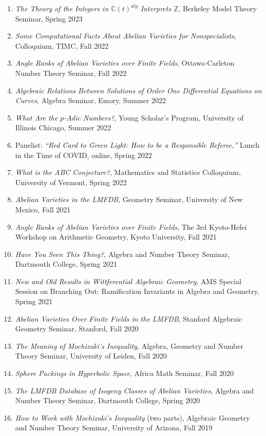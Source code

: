 \documentclass[a4paper,10pt]{article}
\begin{document}
\begin{enumerate}
	\item \emph{The Theory of the Integers in $\mathbb{C}(t)^{alg}$ Interprets $\mathbb{Z}$}, Berkeley Model Theory Seminar, Spring 2023
	\item \emph{Some Computational Facts About Abelian Varieties for Nonspecialists}, Colloquium, TIMC, Fall 2022
	\item \emph{Angle Ranks of Abelian Varieties over Finite Fields}, Ottawa-Carleton Number Theory Seminar, Fall 2022
	\item \emph{Algebraic Relations Between Solutions of Order One Differential Equations on Curves}, Algebra Seminar, Emory, Summer 2022
	\item \emph{What Are the $p$-Adic Numbers?}, Young Scholar’s Program, University of Illinois Chicago, Summer 2022
	\item Panelist: \emph{“Red Card to Green Light: How to be a Responsible Referee,”} Lunch in the Time of COVID, online, Spring 2022
	\item \emph{What is the ABC Conjecture?}, Mathematics and Statistics Colloquium, University of Vermont, Spring 2022
	\item \emph{Abelian Varieties in the LMFDB}, Geometry Seminar, University of New Mexico, Fall 2021
	\item \emph{Angle Ranks of Abelian Varieties over Finite Fields}, The 3rd Kyoto-Hefei Workshop on Arithmetic Geometry, Kyoto University, Fall 2021
	\item \emph{Have You Seen This Thing?}, Algebra and Number Theory Seminar, Dartmouth College, Spring 2021
	\item \emph{New and Old Results in Wittferential Algebraic Geometry}, AMS Special Session on Branching Out: Ramification Invariants in Algebra and Geometry, Spring 2021
	\item \emph{Abelian Varieties Over Finite Fields in the LMFDB}, Stanford Algebraic Geometry Seminar, Stanford, Fall 2020
	\item \emph{The Meaning of Mochizuki’s Inequality}, Algebra, Geometry and Number Theory Seminar, University of Leiden, Fall 2020
	\item \emph{Sphere Packings in Hyperbolic Space}, Africa Math Seminar, Fall 2020
	\item \emph{The LMFDB Database of Isogeny Classes of Abelian Varieties}, Algebra and Number Theory Seminar, Dartmouth College, Spring 2020
	\item \emph{How to Work with Mochizuki's Inequality} (two parts), Algebraic Geometry and Number Theory Seminar, University of Arizona, Fall 2019

\end{enumerate}
\end{document}
